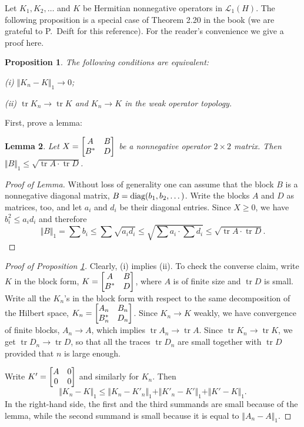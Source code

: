 \documentclass[12pt]{amsart}
\newcommand{\tr}{\operatorname{tr}}
\newcommand{\Lc}{\mathcal{L}}
\theoremstyle{plain}
\newtheorem{lemma}{Lemma}[section]
\newtheorem{proposition}[lemma]{Proposition}
\theoremstyle{definition}
\numberwithin{equation}{section}
\begin{document}
Let $K_1,K_2,\dots$ and $K$ be Hermitian nonnegative operators in
$\Lc_1(H)$. The following proposition is a special case of Theorem 2.20 in the book
\cite{Si2} (we are grateful to P.~Deift for this reference). For the reader's convenience
we give a proof here. 

\begin{proposition}\label{p56} The following conditions are equivalent:

{\rm(i)} $\Vert K_n-K\Vert_1\to0$;

{\rm(ii)} $\tr K_n\to \tr K$ and $K_n\to K$ in the weak operator topology. 
\end{proposition}

First, prove a lemma:

\begin{lemma}\label{l57} Let $X=\bmatrix A & B\\ B^* & D \endbmatrix$ be a
nonnegative operator $2\times 2$ matrix. Then 
$\Vert B\Vert_1\le \sqrt{\tr A\cdot\tr D}$.
\end{lemma} 

\begin{proof}[Proof of Lemma] Without loss of generality one can assume that
the block $B$ is a nonnegative diagonal matrix,
$B=\textup{diag}(b_1,b_2,\dots)$. Write the blocks $A$ and $D$ as matrices,
too, and let $a_i$ and $d_i$ be their diagonal entries. Since
$X\ge0$, we have  $b_i^2\le a_id_i$ and therefore 
%
\begin{equation*}
\Vert B\Vert_1=\sum b_i\le\sum\sqrt{a_i d_i}\le 
\sqrt {\sum a_i\cdot\sum d_i}\le
\sqrt{\tr A\cdot\tr D}.
\end{equation*}
%
\end{proof}


\begin{proof}[Proof of Proposition \ref{p56}] Clearly, (i) implies (ii). To check the
converse claim, write $K$ in the block form, 
$K=\bmatrix A & B\\ B^* & D \endbmatrix$, where $A$ is of finite size
and $\tr D$ is small. Write all the $K_n$'s in the block
form with respect to the same decomposition of the Hilbert space, 
$K_n=\bmatrix A_n & B_n\\ B_n^* & D_n \endbmatrix$. Since $K_n\to K$
weakly, we have convergence of finite blocks, $A_n\to A$, which implies
$\tr A_n\to \tr A$. Since $\tr K_n\to \tr K$, we get $\tr D_n\to\tr
D$, so that all the traces $\tr D_n$ are small together with $\tr D$
provided that $n$ is large enough.

Write $K'=\bmatrix A & 0\\ 0 & 0 \endbmatrix$ and similarly for
$K_n$. Then 
%
\begin{equation*}
\Vert K_n-K\Vert_1\le 
\Vert K_n-K'_n\Vert_1+
\Vert K'_n-K'\Vert_1+
\Vert K'-K\Vert_1.
\end{equation*}
%
In the right-hand side, the first and the third summands are small because of the
lemma, while the second summand is small because it is equal to 
$\Vert A_n-A\Vert_1$. 
\end{proof}
\end{document}
